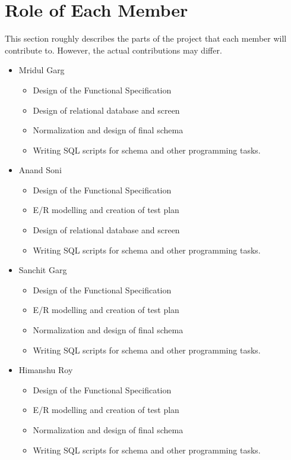 \documentclass[11pt]{article}
\begin{document}
\section{Role of Each Member}
This section roughly describes the parts of the project that each member will contribute to. However, the actual contributions may differ.
\begin{itemize}
\item Mridul Garg
\begin{itemize}
\item Design of the Functional Specification
\item Design of relational database and screen
\item Normalization and design of final schema
\item Writing SQL scripts for schema and other programming tasks.
\end{itemize}
\item Anand Soni
\begin{itemize}
\item Design of the Functional Specification
\item E/R modelling and creation of test plan 
\item Design of relational database and screen
\item Writing SQL scripts for schema and other programming tasks.
\end{itemize}
\item Sanchit Garg
\begin{itemize}
\item Design of the Functional Specification
\item E/R modelling and creation of test plan
\item Normalization and design of final schema
\item Writing SQL scripts for schema and other programming tasks.
\end{itemize}
\item Himanshu Roy
\begin{itemize}
\item Design of the Functional Specification
\item E/R modelling and creation of test plan
\item Normalization and design of final schema
\item Writing SQL scripts for schema and other programming tasks.
\end{itemize}
\end{itemize}
\end{document}
